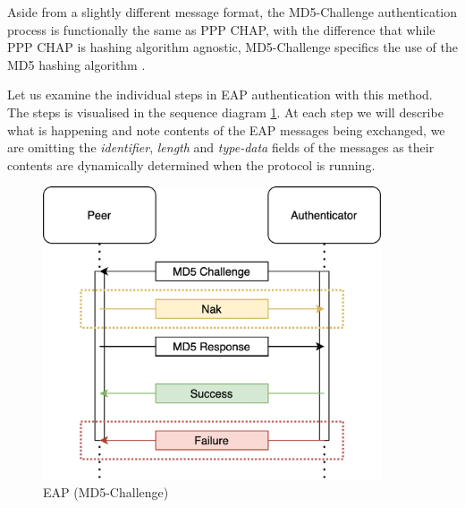 Aside from a slightly different message format, the MD5-Challenge authentication process is functionally the same as PPP CHAP, with the difference that while PPP CHAP is hashing algorithm agnostic, MD5-Challenge specifics the use of the MD5 hashing algorithm \cite{rivest1992md5}.

\bigskip
\noindent
Let us examine the individual steps in EAP authentication with this method. 
The steps is visualised in the sequence diagram \ref{fig:eap-md5}.
At each step we will describe what is happening and note contents of the EAP messages being exchanged, we are omitting the \textit{identifier}, \textit{length} and \textit{type-data} fields of the messages as their contents are dynamically determined when the protocol is running.

\begin{figure}[h]
	\centering
	\includegraphics[width=10cm]{images/eap-md5-2}
	\caption{EAP (MD5-Challenge)}
	\label{fig:eap-md5}
\end{figure}

